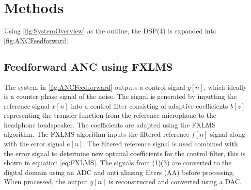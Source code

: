 \section{Methods}

Using \autoref{fig:SystemOverview} as the outline, the DSP(4) is expanded into \autoref{fig:ANCFeedforward}.




\subsection{Feedforward ANC using FXLMS}


The system in \autoref{fig:ANCFeedforward} outputs a control signal $y[n]$, which ideally is a counter-phase signal of the noise. The signal is generated by inputting the reference signal $x[n]$ into a control filter consisting of adaptive coefficients $b[z]$ representing the transfer function from the reference microphone to the headphone loudspeaker. The coefficients are adapted using the FXLMS algorithm. The FXLMS algorithm inputs the filtered reference $f[n]$ signal along with the error signal $e[n]$. The filtered reference signal is used combined with the error signal to determine new optimal coefficients for the control filter, this is shown in equation \ref{eq:FXLMS}. The signals from (1)(3) are converted to the digital domain using an ADC and anti aliasing filters (AA) before processing. When processed, the output $y[n]$ is reconstructed and converted using a DAC.


